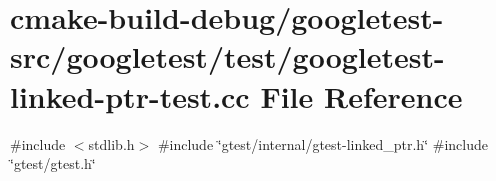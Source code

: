 \hypertarget{googletest-linked-ptr-test_8cc}{}\section{cmake-\/build-\/debug/googletest-\/src/googletest/test/googletest-\/linked-\/ptr-\/test.cc File Reference}
\label{googletest-linked-ptr-test_8cc}
{\ttfamily \#include $<$stdlib.\+h$>$}\newline
{\ttfamily \#include \char`\"{}gtest/internal/gtest-\/linked\+\_\+ptr.\+h\char`\"{}}\newline
{\ttfamily \#include \char`\"{}gtest/gtest.\+h\char`\"{}}\newline
